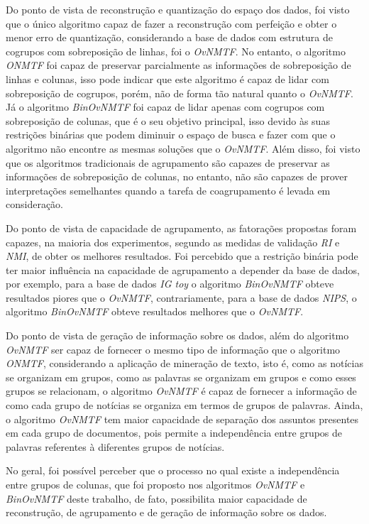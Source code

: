 \documentclass[
    12pt,                %
    oneside,            %
    a4paper,            %
    english,            %
    brazil                %
    ]{abntex2ppgsi}
\begin{document}
Do ponto de vista de reconstrução e quantização do espaço dos dados, foi visto que o único algoritmo capaz de fazer a reconstrução com perfeição e obter o menor erro de quantização, considerando a base de dados com estrutura de cogrupos com sobreposição de linhas, foi o \textit{OvNMTF}.
No entanto, o algoritmo \textit{ONMTF} foi capaz de preservar parcialmente as informações de sobreposição de linhas e colunas, isso pode indicar que este algoritmo é capaz de lidar com sobreposição de cogrupos, porém, não de forma tão natural quanto o \textit{OvNMTF}.
Já o algoritmo \textit{BinOvNMTF} foi capaz de lidar apenas com cogrupos com sobreposição de colunas, que é o seu objetivo principal, isso devido às suas restrições binárias que podem diminuir o espaço de busca e fazer com que o algoritmo não encontre as mesmas soluções que o \textit{OvNMTF}.
Além disso, foi visto que os algoritmos tradicionais de agrupamento são capazes de preservar as informações de sobreposição de colunas, no entanto, não são capazes de prover interpretações semelhantes quando a tarefa de coagrupamento é levada em consideração.

Do ponto de vista de capacidade de agrupamento, as fatorações propostas foram capazes, na maioria dos experimentos, segundo as medidas de validação \textit{RI} e \textit{NMI}, de obter os melhores resultados.
Foi percebido que a restrição binária pode ter maior influência na capacidade de agrupamento a depender da base de dados, por exemplo, para a base de dados \textit{IG toy} o algoritmo \textit{BinOvNMTF} obteve resultados piores que o \textit{OvNMTF}, contrariamente, para a base de dados \textit{NIPS}, o algoritmo \textit{BinOvNMTF} obteve resultados melhores que o \textit{OvNMTF}.

Do ponto de vista de geração de informação sobre os dados, além do algoritmo \textit{OvNMTF} ser capaz de fornecer o mesmo tipo de informação que o algoritmo \textit{ONMTF}, considerando a aplicação de mineração de texto, isto é, como as notícias se organizam em grupos, como as palavras se organizam em grupos e como esses grupos se relacionam, o algoritmo \textit{OvNMTF} é capaz de fornecer a informação de como cada grupo de notícias se organiza em termos de grupos de palavras.
Ainda, o algoritmo \textit{OvNMTF} tem maior capacidade de separação dos assuntos presentes em cada grupo de documentos, pois permite a independência entre grupos de palavras referentes à diferentes grupos de notícias.

No geral, foi possível perceber que o processo no qual existe a independência entre grupos de colunas, que foi proposto nos algoritmos \textit{OvNMTF} e \textit{BinOvNMTF} deste trabalho, de fato, possibilita maior capacidade de reconstrução, de agrupamento e de geração de informação sobre os dados.
\end{document}

